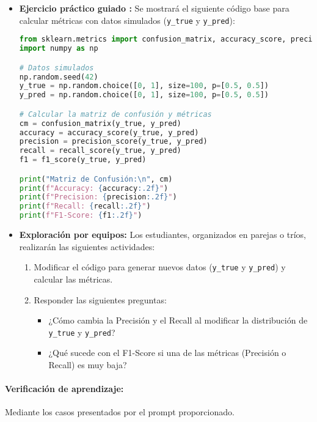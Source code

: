 \documentclass[a4,11pt]{aleph-notas}
\begin{document}
\begin{itemize}[leftmargin=*]
    \item \textbf{Ejercicio práctico guiado :}  
    Se mostrará el siguiente código base para calcular métricas con datos simulados (\texttt{y\_true} y \texttt{y\_pred}):

\begin{pycodigo}
\begin{lstlisting}[language=Python]
from sklearn.metrics import confusion_matrix, accuracy_score, precision_score, recall_score, f1_score
import numpy as np

# Datos simulados
np.random.seed(42)
y_true = np.random.choice([0, 1], size=100, p=[0.5, 0.5])
y_pred = np.random.choice([0, 1], size=100, p=[0.5, 0.5])

# Calcular la matriz de confusión y métricas
cm = confusion_matrix(y_true, y_pred)
accuracy = accuracy_score(y_true, y_pred)
precision = precision_score(y_true, y_pred)
recall = recall_score(y_true, y_pred)
f1 = f1_score(y_true, y_pred)

print("Matriz de Confusión:\n", cm)
print(f"Accuracy: {accuracy:.2f}")
print(f"Precision: {precision:.2f}")
print(f"Recall: {recall:.2f}")
print(f"F1-Score: {f1:.2f}")
\end{lstlisting}
\end{pycodigo}

    \item \textbf{Exploración por equipos:}  
    Los estudiantes, organizados en parejas o tríos, realizarán las siguientes actividades:
    \begin{enumerate}[leftmargin=*]
        \item Modificar el código para generar nuevos datos (\texttt{y\_true} y \texttt{y\_pred}) y calcular las métricas.
        \item Responder las siguientes preguntas:
            \begin{itemize}[leftmargin=*]
                \item ¿Cómo cambia la Precisión y el Recall al modificar la distribución de \texttt{y\_true} y \texttt{y\_pred}?
                \item ¿Qué sucede con el F1-Score si una de las métricas (Precisión o Recall) es muy baja?
            \end{itemize}
        \end{enumerate}
    \end{itemize}

\paragraph{Verificación de aprendizaje:}  
    Mediante los casos presentados por el prompt proporcionado.
\end{document}
